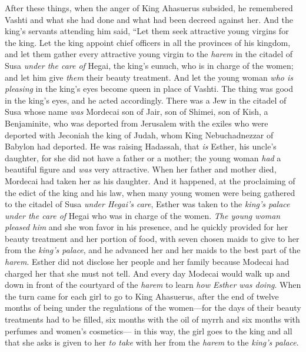 \begin{biblechapter} %
 After these things, when the anger of King Ahasuerus subsided, he remembered Vashti and what she had done and what had been decreed against her.
\verse And the king’s servants attending him said, “Let them seek attractive young virgins for the king.
\verse Let the king appoint chief officers in all the provinces of his kingdom, and let them gather every attractive young virgin to the \textit{harem} in the citadel of Susa \textit{under the care of} Hegai, the king’s eunuch, who is in charge of the women; and let him give \textit{them} their beauty treatment.
\verse And let the young woman \textit{who is pleasing} in the king’s eyes become queen in place of Vashti. The thing was good in the king’s eyes, and he acted accordingly.
\verse There was a Jew in the citadel of Susa whose name \textit{was} Mordecai son of Jair, son of Shimei, son of Kish, a Benjaminite,
\verse who was deported from Jerusalem with the exiles who were deported with Jeconiah the king of Judah, whom King Nebuchadnezzar of Babylon had deported.
\verse He was raising Hadassah, that \textit{is} Esther, his uncle’s daughter, for she did not have a father or a mother; the young woman \textit{had} a beautiful figure and \textit{was} very attractive. When her father and mother died, Mordecai had taken her as his daughter.
\verse And it happened, at the proclaiming of the edict of the king and his law, when many young women were being gathered to the citadel of Susa \textit{under Hegai’s care}, Esther was taken to the \textit{king’s palace} \textit{under the care of} Hegai who was in charge of the women.
\verse \textit{The young woman pleased him} and she won favor in his presence, and he quickly provided for her beauty treatment and her portion of food, with seven chosen maids to give to her from the \textit{king’s palace}, and he advanced her and her maids to the best part of the \textit{harem}.
\verse Esther did not disclose her people and her family because Modecai had charged her that she must not tell.
\verse And every day Modecai would walk up and down in front of the courtyard of the \textit{harem} to learn \textit{how Esther was doing}.
\verse When the turn came for each girl to go to King Ahasuerus, after the end of twelve months of being under the regulations of the women—for the days of their beauty treatments had to be filled, six months with the oil of myrrh and six months with perfumes and women’s cosmetics—
\verse in this way, the girl goes to the king and all that she asks is given to her \textit{to take} with her from the \textit{harem} to the \textit{king’s palace}.

\end{biblechapter}
